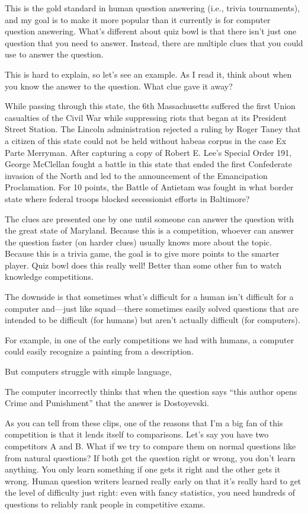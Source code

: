 This is the gold standard in human question answering (i.e., trivia tournaments), and my goal is to make it more popular than it currently is for computer question answering.  What’s different about quiz bowl is that there isn’t just one question that you need to answer.  Instead, there are multiple clues that you could use to answer the question.  

This is hard to explain, so let’s see an example.  As I read it, think about when you know the answer to the question.  What clue gave it away?

While passing through this state, the 6th Massachusetts
suffered the first Union casualties of the Civil War while
suppressing riots that began at its President Street
Station. The Lincoln administration rejected a ruling by
Roger Taney that a citizen of this state could not
be held without habeas corpus in the case Ex Parte
Merryman. After capturing a copy of Robert E. Lee’s
Special Order 191, George McClellan fought a battle in
this state that ended the first Confederate invasion of
the North and led to the announcement of the
Emancipation Proclamation. For 10 points, the Battle of
Antietam was fought in what border state where federal
troops blocked secessionist efforts in Baltimore?



The clues are presented one by one until someone can answer the question with the great state of Maryland. Because this is a competition, whoever can answer the question faster (on harder clues) usually knows more about the topic.  Because this is a trivia game, the goal is to give more points to the smarter player.  Quiz bowl does this really well!  Better than some other fun to watch knowledge competitions.

The downside is that sometimes what's difficult for a human isn't difficult for a computer and—just like squad—there sometimes easily solved questions that are intended to be difficult (for humans) but aren't actually difficult (for computers).  

For example, in one of the early competitions we had with humans, a computer could easily recognize a painting from a description. 

But computers struggle with simple language, 

The computer incorrectly thinks that when the question says “this author opens Crime and Punishment” that the answer is Dostoyevski.

As you can tell from these clips, one of the reasons that I’m a big fan of this competition is that it lends itself to comparisons. Let’s say you have two competitors A and B. What if we try to compare them on normal questions like from natural questions? If both get the question right or wrong, you don’t learn anything. You only learn something if one gets it right and the other gets it wrong. Human question writers learned really early on that it’s really hard to get the level of difficulty just right: even with fancy statistics, you need hundreds of questions to reliably rank people in competitive exams.


